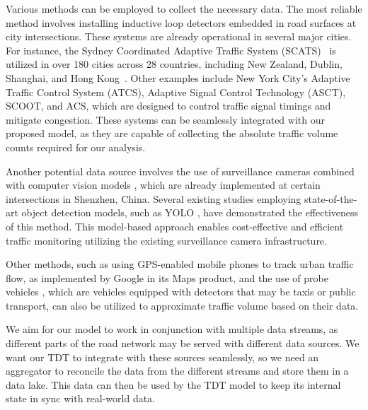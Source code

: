 
Various methods can be employed to collect the necessary data. The most reliable method involves installing inductive loop detectors embedded in road surfaces at city intersections. These systems are already operational in several major cities. For instance, the Sydney Coordinated Adaptive Traffic System (SCATS)~\cite{scats} is utilized in over 180 cities across 28 countries, including New Zealand, Dublin, Shanghai, and Hong Kong~\cite{wiki:sydney_traffic_system}. Other examples include New York City's Adaptive Traffic Control System (ATCS), Adaptive Signal Control Technology (ASCT), SCOOT, and ACS, which are designed to control traffic signal timings and mitigate congestion. These systems can be seamlessly integrated with our proposed model, as they are capable of collecting the absolute traffic volume counts required for our analysis.

Another potential data source involves the use of surveillance cameras combined with computer vision models \cite{jain2019review}, which are already implemented at certain intersections in Shenzhen, China. Several existing studies \cite{asha2018vehicle} employing state-of-the-art object detection models, such as YOLO \cite{redmon2018yolov3}, have demonstrated the effectiveness of this method. This model-based approach enables cost-effective and efficient traffic monitoring utilizing the existing surveillance camera infrastructure.


Other methods, such as using GPS-enabled mobile phones \cite{rose2006mobile} to track urban traffic flow, as implemented by Google in its Maps product, and the use of probe vehicles \cite{zhu2012probe}, which are vehicles equipped with detectors that may be taxis or public transport, can also be utilized to approximate traffic volume based on their data.

We aim for our model to work in conjunction with multiple data streams, as different parts of the road network may be served with different data sources. We want our TDT to integrate with these sources seamlessly, so we need an aggregator to reconcile the data from the different streams and store them in a data lake. This data can then be used by the TDT model to keep its internal state in sync with real-world data.

